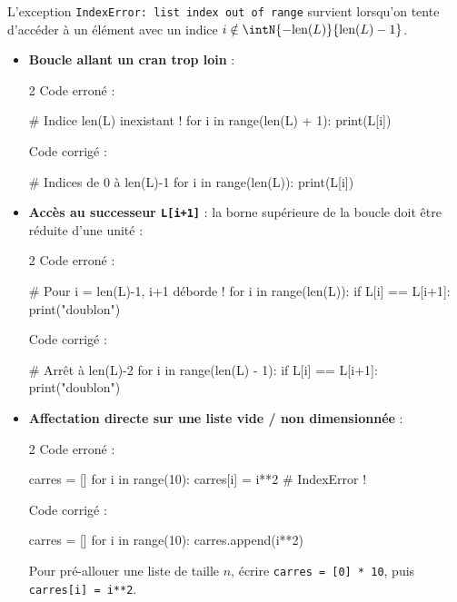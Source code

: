 \documentclass[11pt,a4paper]{article}
\begin{document}
\begin{tcolorbox}[left=0cm,title=\bf{\faBug \; 4. Erreurs d'indice (IndexError)},colbacktitle=cfond]
L'exception \texttt{IndexError: list index out of range} survient lorsqu'on tente d'accéder à un élément avec un indice $i \notin \intN{-\text{len}(L)}{\text{len}(L)-1}$.
\begin{itemize}
	\item[\textbullet] \textbf{Boucle allant un cran trop loin} :
	\setlength{\multicolsep}{0pt}
	\begin{multicols}{2}
		\textcolor{BrickRed}{\faTimesCircle \; Code erroné :}
		\begin{python}
# Indice len(L) inexistant !
for i in range(len(L) + 1):
    print(L[i])
		\end{python}
		\textcolor{OliveGreen}{\faCheckCircle \; Code corrigé :}
		\begin{python}
# Indices de 0 à len(L)-1
for i in range(len(L)):
    print(L[i])
		\end{python}
	\end{multicols}

	\item[\textbullet] \textbf{Accès au successeur \texttt{L[i+1]}} : la borne supérieure de la boucle doit être réduite d'une unité :
	\begin{multicols}{2}
		\textcolor{BrickRed}{\faTimesCircle \; Code erroné :}
		\begin{python}
# Pour i = len(L)-1, i+1 déborde !
for i in range(len(L)):
    if L[i] == L[i+1]:
        print("doublon")
		\end{python}
		\textcolor{OliveGreen}{\faCheckCircle \; Code corrigé :}
		\begin{python}
# Arrêt à len(L)-2
for i in range(len(L) - 1):
    if L[i] == L[i+1]:
        print("doublon")
		\end{python}
	\end{multicols}

	\item[\textbullet] \textbf{Affectation directe sur une liste vide / non dimensionnée} :
	\begin{multicols}{2}
		\textcolor{BrickRed}{\faTimesCircle \; Code erroné :}
		\begin{python}
carres = []
for i in range(10):
    carres[i] = i**2 # IndexError !
		\end{python}
		\textcolor{OliveGreen}{\faCheckCircle \; Code corrigé :}
		\begin{python}
carres = []
for i in range(10):
    carres.append(i**2)
		\end{python}
	\end{multicols}
	{\small \important} Pour pré-allouer une liste de taille $n$, écrire \texttt{carres = [0] * 10}, puis \texttt{carres[i] = i**2}.
	

\end{itemize}
\end{tcolorbox}
\end{document}
